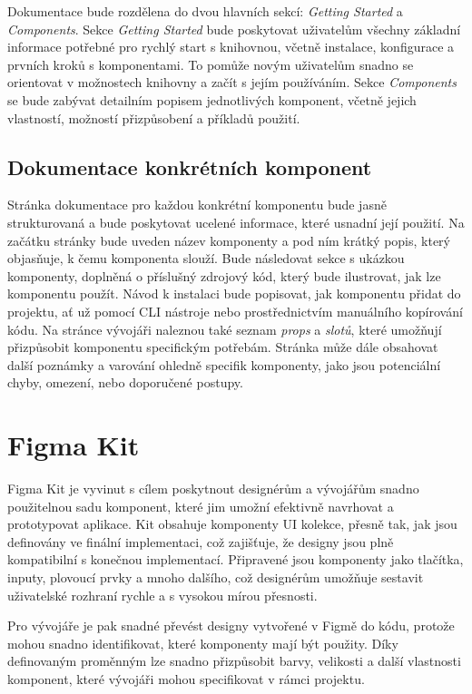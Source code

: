 Dokumentace bude rozdělena do dvou hlavních sekcí: \emph{Getting Started} a \emph{Components}. Sekce \emph{Getting Started} bude poskytovat uživatelům všechny základní informace potřebné pro rychlý start s knihovnou, včetně instalace, konfigurace a prvních kroků s komponentami. To pomůže novým uživatelům snadno se orientovat v možnostech knihovny a začít s jejím používáním. Sekce \emph{Components} se bude zabývat detailním popisem jednotlivých komponent, včetně jejich vlastností, možností přizpůsobení a příkladů použití.

\subsection{Dokumentace konkrétních komponent}
Stránka dokumentace pro každou konkrétní komponentu bude jasně strukturovaná a bude poskytovat ucelené informace, které usnadní její použití. Na začátku stránky bude uveden název komponenty a pod ním krátký popis, který objasňuje, k čemu komponenta slouží. Bude následovat sekce s ukázkou komponenty, doplněná o příslušný zdrojový kód, který bude ilustrovat, jak lze komponentu použít. Návod k instalaci bude popisovat, jak komponentu přidat do projektu, ať už pomocí CLI nástroje nebo prostřednictvím manuálního kopírování kódu. Na stránce vývojáři naleznou také seznam \emph{props} a \emph{slotů}, které umožňují přizpůsobit komponentu specifickým potřebám. Stránka může dále obsahovat další poznámky a varování ohledně specifik komponenty, jako jsou potenciální chyby, omezení, nebo doporučené postupy.

\section{Figma Kit}
Figma Kit je vyvinut s cílem poskytnout designérům a vývojářům snadno použitelnou sadu komponent, které jim umožní efektivně navrhovat a prototypovat aplikace. Kit obsahuje komponenty UI kolekce, přesně tak, jak jsou definovány ve finální implementaci, což zajišťuje, že designy jsou plně kompatibilní s konečnou implementací. Připravené jsou komponenty jako tlačítka, inputy, plovoucí prvky a mnoho dalšího, což designérům umožňuje sestavit uživatelské rozhraní rychle a s vysokou mírou přesnosti.

Pro vývojáře je pak snadné převést designy vytvořené v Figmě do kódu, protože mohou snadno identifikovat, které komponenty mají být použity. Díky definovaným proměnným lze snadno přizpůsobit barvy, velikosti a další vlastnosti komponent, které vývojáři mohou specifikovat v rámci projektu.

